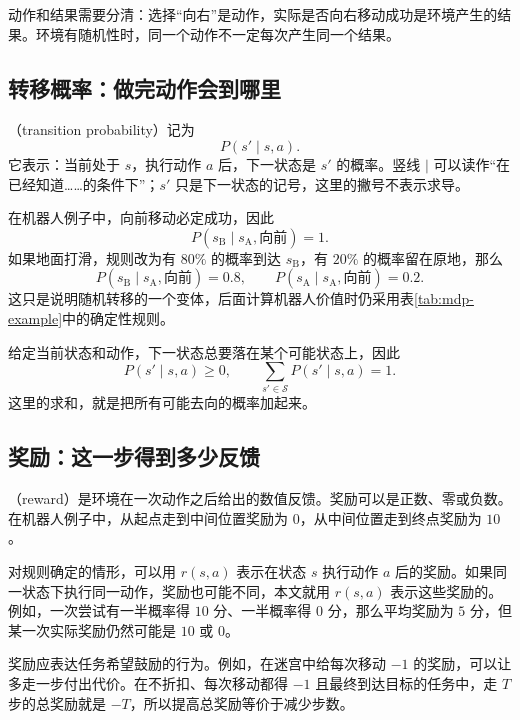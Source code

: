 \documentclass[UTF8]{ctexart}
\begin{document}
动作和结果需要分清：选择“向右”是动作，实际是否向右移动成功是环境产生的结果。环境有随机性时，同一个动作不一定每次产生同一个结果。

\subsection{转移概率：做完动作会到哪里}

（transition probability）记为
\begin{equation}
  P(s'\mid s,a).
  \label{eq:mdp-transition}
\end{equation}
它表示：当前处于 $s$，执行动作 $a$ 后，下一状态是 $s'$ 的概率。竖线 $\mid$ 可以读作“在已经知道……的条件下”；$s'$ 只是下一状态的记号，这里的撇号不表示求导。

在机器人例子中，向前移动必定成功，因此
\[
  P(s_{\mathrm B}\mid s_{\mathrm A},\text{向前})=1.
\]
如果地面打滑，规则改为有 $80\%$ 的概率到达 $s_{\mathrm B}$，有 $20\%$ 的概率留在原地，那么
\[
  P(s_{\mathrm B}\mid s_{\mathrm A},\text{向前})=0.8,
  \qquad
  P(s_{\mathrm A}\mid s_{\mathrm A},\text{向前})=0.2.
\]
这只是说明随机转移的一个变体，后面计算机器人价值时仍采用表\ref{tab:mdp-example}中的确定性规则。

给定当前状态和动作，下一状态总要落在某个可能状态上，因此
\begin{equation}
  P(s'\mid s,a)\geq0,
  \qquad \sum_{s'\in\mathcal S}P(s'\mid s,a)=1.
  \label{eq:mdp-transition-sum}
\end{equation}
这里的求和，就是把所有可能去向的概率加起来。

\subsection{奖励：这一步得到多少反馈}

（reward）是环境在一次动作之后给出的数值反馈。奖励可以是正数、零或负数。在机器人例子中，从起点走到中间位置奖励为 $0$，从中间位置走到终点奖励为 $10$。

对规则确定的情形，可以用 $r(s,a)$ 表示在状态 $s$ 执行动作 $a$ 后的奖励。如果同一状态下执行同一动作，奖励也可能不同，本文就用 $r(s,a)$ 表示这些奖励的。例如，一次尝试有一半概率得 $10$ 分、一半概率得 $0$ 分，那么平均奖励为 $5$ 分，但某一次实际奖励仍然可能是 $10$ 或 $0$。

奖励应表达任务希望鼓励的行为。例如，在迷宫中给每次移动 $-1$ 的奖励，可以让多走一步付出代价。在不折扣、每次移动都得 $-1$ 且最终到达目标的任务中，走 $T$ 步的总奖励就是 $-T$，所以提高总奖励等价于减少步数。
\end{document}
